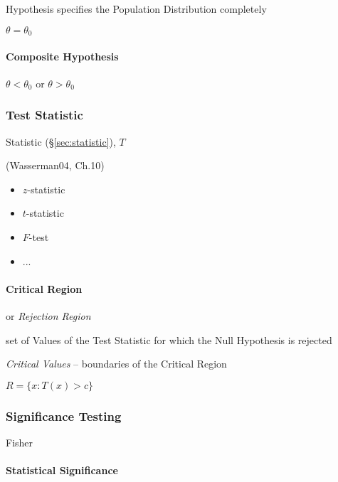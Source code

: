 Hypothesis specifies the Population Distribution completely

$\theta = \theta_0$



\paragraph{Composite Hypothesis}\label{sec:composite_hypothesis}\hfill

$\theta < \theta_0$ or $\theta > \theta_0$



\subsubsection{Test Statistic}\label{sec:test_statistic}

Statistic (\S\ref{sec:statistic}), $T$

(Wasserman04, Ch.10)

\begin{itemize}
  \item $z$-statistic
  \item $t$-statistic
  \item $F$-test
  \item ...
\end{itemize}



\paragraph{Critical Region}\label{sec:critical_region}\hfill

or \emph{Rejection Region}

set of Values of the Test Statistic for which the Null Hypothesis is rejected

\emph{Critical Values} -- boundaries of the Critical Region

$R = \{ x : T(x) > c \}$



\subsubsection{Significance Testing}\label{sec:significance_testing}

Fisher



\paragraph{Statistical Significance}\label{sec:statistical_significance}\hfill


